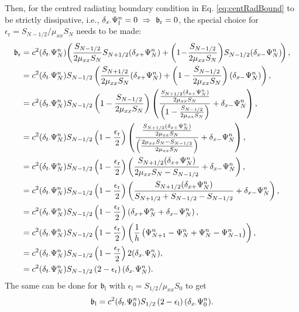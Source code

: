 Then, for the centred radiating boundary condition in Eq. \eqref{eq:centRadBound} to be strictly dissipative, i.e., $\dxd \Psiln = 0 \ \Rightarrow \ \b_\text{r} = 0$, the special choice for $\epsilon_\text{r} = S_{N-1/2} / \mu_{xx}S_N$ needs to be made:
\begin{equation}
    \begin{aligned}
        \mathfrak{b}_\text{r} &= c^2 (\delta_{t\cdot}\Psi_N^n)\!\left(\frac{S_{N-1/2}}{2\mu_{xx}S_N}S_{N+1/2}(\delta_{x+}\Psi_N^n)+\left(1\!-\!\frac{S_{N-1/2}}{2\mu_{xx}S_N}\right)\!S_{N-1/2}(\delta_{x-}\Psi_N^n)\!\right),\\
        &= c^2 (\delta_{t\cdot}\Psi_N^n)S_{N-1/2}\left(\frac{S_{N+1/2}}{2\mu_{xx}S_N}(\delta_{x+}\Psi_N^n)+\left(1-\frac{S_{N-1/2}}{2\mu_{xx}S_N}\right)(\delta_{x-}\Psi_N^n)\right),\\
        &=c^2 (\delta_{t\cdot}\Psi_N^n)S_{N-1/2}\left(1-\frac{S_{N-1/2}}{2\mu_{xx}S_N}\right)\left(\frac{\frac{S_{N+1/2}(\delta_{x+}\Psi_N^n)}{2\mu_{xx}S_N}}{\left(1-\frac{S_{N-1/2}}{2\mu_{xx}S_N}\right)}+\delta_{x-}\Psi_N^n\right),\\
        &=c^2 (\delta_{t\cdot}\Psi_N^n)S_{N-1/2}\left(1-\frac{\epsilon_\text{r}}{2}\right)\left(\frac{\frac{S_{N+1/2}(\delta_{x+}\Psi_N^n)}{2\mu_{xx}S_N}}{\left(\frac{2\mu_{xx}S_N - S_{N-1/2}}{2\mu_{xx}S_N}\right)}+\delta_{x-}\Psi_N^n\right),\\
        &=c^2 (\delta_{t\cdot}\Psi_N^n)S_{N-1/2}\left(1-\frac{\epsilon_\text{r}}{2}\right)\left(\frac{S_{N+1/2}(\delta_{x+}\Psi_N^n)}{2\mu_{xx}S_N - S_{N-1/2}}+\delta_{x-}\Psi_N^n\right),\\
        &=c^2 (\delta_{t\cdot}\Psi_N^n)S_{N-1/2}\left(1-\frac{\epsilon_\text{r}}{2}\right)\left(\frac{S_{N+1/2}(\delta_{x+}\Psi_N^n)}{S_{N+1/2} + S_{N-1/2} - S_{N-1/2}}+\delta_{x-}\Psi_N^n\right),\\
        &=c^2 (\delta_{t\cdot}\Psi_N^n)S_{N-1/2}\left(1-\frac{\epsilon_\text{r}}{2}\right)\left(\delta_{x+}\Psi_N^n+\delta_{x-}\Psi_N^n\right),\\
        &=c^2 (\delta_{t\cdot}\Psi_N^n)S_{N-1/2}\left(1-\frac{\epsilon_\text{r}}{2}\right)\left(\frac{1}{h}\left(\Psi_{N+1}^n - \Psi_N^n + \Psi_N^n - \Psi_{N-1}^n\right)\right),\\
&= c^2 (\delta_{t\cdot}\Psi_N^n)S_{N-1/2}\left(1-\frac{\epsilon_\text{r}}{2}\right)2(\delta_{x\cdot}\Psi_N^n),\\
&= c^2 (\delta_{t\cdot}\Psi_N^n)S_{N-1/2}\left(2-\epsilon_\text{r}\right)(\delta_{x\cdot}\Psi_N^n).
    \end{aligned}
\end{equation}
The same can be done for $\mathfrak{b}_\text{l}$ with $\epsilon_\text{l} = S_{1/2}/\mu_{xx}S_0$ to get
\begin{equation}
    \mathfrak{b}_\text{l} = c^2(\delta_{t\cdot}\Psi_0^n)S_{1/2}\left(2-\epsilon_\text{l}\right)(\delta_{x\cdot}\Psi_0^n).
\end{equation}


